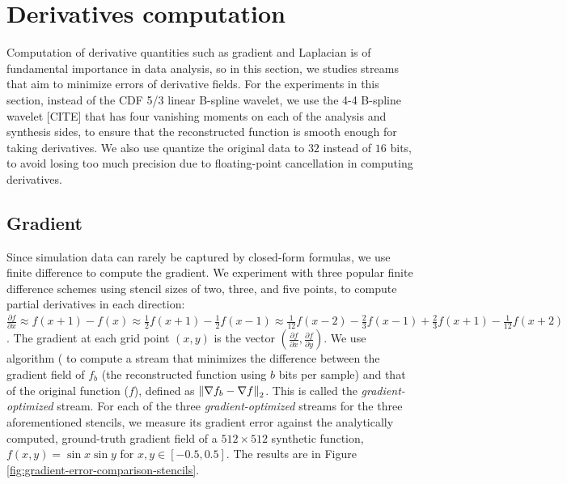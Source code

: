 \section{Derivatives computation}

Computation of derivative quantities such as gradient and Laplacian is of fundamental importance in
data analysis, so in this section, we studies streams that aim to minimize errors of derivative
fields. For the experiments in this section, instead of the CDF 5/3 linear B-spline wavelet, we use
the 4-4 B-spline wavelet [CITE] that has four vanishing moments on each of the analysis and
synthesis sides, to ensure that the reconstructed function is smooth enough for taking derivatives.
We also use quantize the original data to $32$ instead of $16$ bits, to avoid losing too much
precision due to floating-point cancellation in computing derivatives.

\subsection{Gradient}

Since simulation data can rarely be captured by closed-form formulas, we use finite difference to
compute the gradient. We experiment with three popular finite difference schemes using stencil sizes
of two, three, and five points, to compute partial derivatives in each direction: $\frac{\partial
f}{\partial x}\approx f(x+1)-f(x) \approx \frac{1}{2}f(x+1)-\frac{1}{2}f(x-1) \approx
\frac{1}{12}f(x-2)-\frac{2}{3}f(x-1)+\frac{2}{3}f(x+1)-\frac{1}{12}f(x+2)$. The gradient at each
grid point $(x,y)$ is the vector $(\frac{\partial f}{\partial x},\frac{\partial f}{\partial y})$. We
use algorithm ( to compute a stream that minimizes the difference between
the gradient field of $f_b$ (the reconstructed function using $b$ bits per sample) and that of the
original function ($f$), defined as $\left\lVert\nabla f_b-\nabla f\right\rVert_2$. This is called the
\emph{gradient-optimized} stream. For each of the three \emph{gradient-optimized} streams for the
three aforementioned stencils, we measure its gradient error against the analytically computed,
ground-truth gradient field of a $512\times 512$ synthetic function, $f(x,y)=\sin x\sin y$ for
$x,y\in[-0.5,0.5]$. The results are in Figure \ref{fig:gradient-error-comparison-stencils}.

